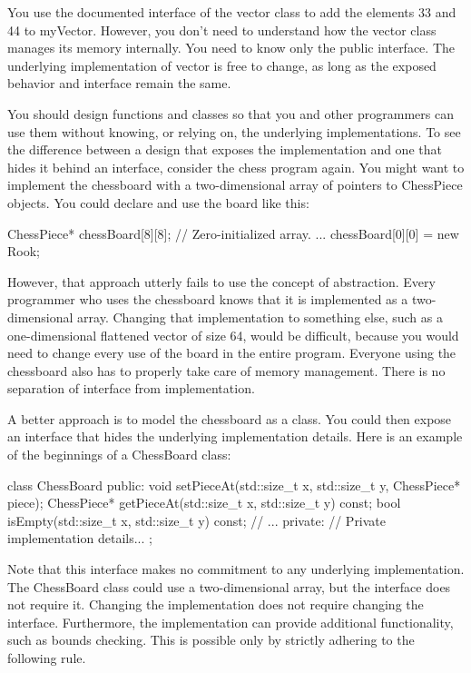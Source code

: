 You use the documented interface of the vector class to add the elements 33 and 44 to myVector. However, you don’t need to understand how the vector class manages its memory internally. You need to know only the public interface. The underlying implementation of vector is free to change, as long as the exposed behavior and interface remain the same.


You should design functions and classes so that you and other programmers can use them without knowing, or relying on, the underlying implementations. To see the difference between a design that exposes the implementation and one that hides it behind an interface, consider the chess program again. You might want to implement the chessboard with a two-dimensional array of pointers to ChessPiece objects. You could declare and use the board like this:

\begin{cpp}
ChessPiece* chessBoard[8][8]{}; // Zero-initialized array.
...
chessBoard[0][0] = new Rook{};
\end{cpp}

However, that approach utterly fails to use the concept of abstraction. Every programmer who uses the chessboard knows that it is implemented as a two-dimensional array. Changing that implementation to something else, such as a one-dimensional flattened vector of size 64, would be difficult, because you would need to change every use of the board in the entire program. Everyone using the chessboard also has to properly take care of memory management. There is no separation of interface from implementation.

A better approach is to model the chessboard as a class. You could then expose an interface that hides the underlying implementation details. Here is an example of the beginnings of a ChessBoard class:

\begin{cpp}
class ChessBoard
{
    public:
        void setPieceAt(std::size_t x, std::size_t y, ChessPiece* piece);
        ChessPiece* getPieceAt(std::size_t x, std::size_t y) const;
        bool isEmpty(std::size_t x, std::size_t y) const;
        // ...
    private:
        // Private implementation details...
};
\end{cpp}

Note that this interface makes no commitment to any underlying implementation. The ChessBoard class could use a two-dimensional array, but the interface does not require it. Changing the implementation does not require changing the interface. Furthermore, the implementation can provide additional functionality, such as bounds checking. This is possible only by strictly adhering to the following rule.

